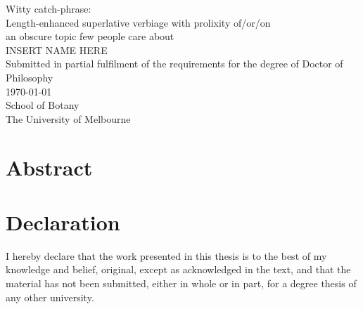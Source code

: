 
\hypertarget{TitlePage}{}


\begin{spacing}{1}
\begin{titlepage}
\begin{center}
\vspace*{9pt}
{\Medium\huge Witty catch-phrase:\\\smallskip Length-enhanced superlative verbiage with prolixity of/or/on\\\bigskip an obscure topic few people care about\\[3.5cm]}
\LARGE INSERT NAME HERE\\[2cm]
{\LARGE Submitted in partial fulfilment of the requirements for the degree of Doctor of Philosophy\\
\vfill
\today\\
\vspace{37pt}
School of Botany\\
The University of Melbourne}
\vfill
\end{center}
\end{titlepage}
\end{spacing}



\setcounter{page}{1}
\chapter*{\vspace*{-0.5cm}Abstract}
{}
\Minion
\lipsum


\chapter*{\vspace*{-0.5cm}Declaration}
{}
\Minion
I hereby declare that the work presented in this thesis is to the best of my knowledge and belief, original, except as acknowledged in the text, and that the material has not been submitted, either in whole or in part, for a degree thesis of any other university.

